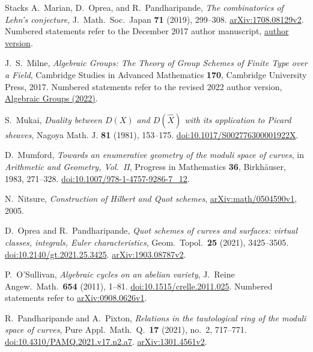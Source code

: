 \begin{thebibliography}{Stacks}
A.~Marian, D.~Oprea, and R.~Pandharipande,
\emph{The combinatorics of Lehn's conjecture},
J.\ Math.\ Soc.\ Japan \textbf{71} (2019), 299--308.
\href{https://arxiv.org/abs/1708.08129v2}{arXiv:1708.08129v2}.
Numbered statements refer to the December 2017 author manuscript,
\href{https://people.math.ethz.ch/~rahul/LehnF.pdf}{author version}.

J.~S.~Milne,
\emph{Algebraic Groups: The Theory of Group Schemes of Finite Type over a Field},
Cambridge Studies in Advanced Mathematics \textbf{170}, Cambridge University Press, 2017.
Numbered statements refer to the revised 2022 author version,
\href{https://www.jmilne.org/math/Books/iAG2022.pdf}{Algebraic Groups (2022)}.

S.~Mukai,
\emph{Duality between $D(X)$ and $D(\widehat X)$ with its application to Picard sheaves},
Nagoya Math. J. \textbf{81} (1981), 153--175.
\href{https://doi.org/10.1017/S002776300001922X}{doi:10.1017/S002776300001922X}.

D.~Mumford,
\emph{Towards an enumerative geometry of the moduli space of curves},
in \emph{Arithmetic and Geometry, Vol.~II}, Progress in Mathematics
\textbf{36}, Birkh\"auser, 1983, 271--328.
\href{https://doi.org/10.1007/978-1-4757-9286-7_12}{doi:10.1007/978-1-4757-9286-7\_12}.

N.~Nitsure,
\emph{Construction of Hilbert and Quot schemes},
\href{https://arxiv.org/abs/math/0504590v1}{arXiv:math/0504590v1}, 2005.

D.~Oprea and R.~Pandharipande,
\emph{Quot schemes of curves and surfaces: virtual classes, integrals,
Euler characteristics},
Geom.\ Topol.\ \textbf{25} (2021), 3425--3505.
\href{https://doi.org/10.2140/gt.2021.25.3425}{doi:10.2140/gt.2021.25.3425}.
\href{https://arxiv.org/abs/1903.08787v2}{arXiv:1903.08787v2}.

P.~O'Sullivan,
\emph{Algebraic cycles on an abelian variety},
J.\ Reine Angew.\ Math.\ \textbf{654} (2011), 1--81.
\href{https://doi.org/10.1515/crelle.2011.025}{doi:10.1515/crelle.2011.025}.
Numbered statements refer to
\href{https://arxiv.org/abs/0908.0626v1}{arXiv:0908.0626v1}.

R.~Pandharipande and A.~Pixton,
\emph{Relations in the tautological ring of the moduli space of curves},
Pure Appl.\ Math.\ Q.\ \textbf{17} (2021), no.~2, 717--771.
\href{https://doi.org/10.4310/PAMQ.2021.v17.n2.a7}{doi:10.4310/PAMQ.2021.v17.n2.a7}.
\href{https://arxiv.org/abs/1301.4561v2}{arXiv:1301.4561v2}.


\end{thebibliography}
